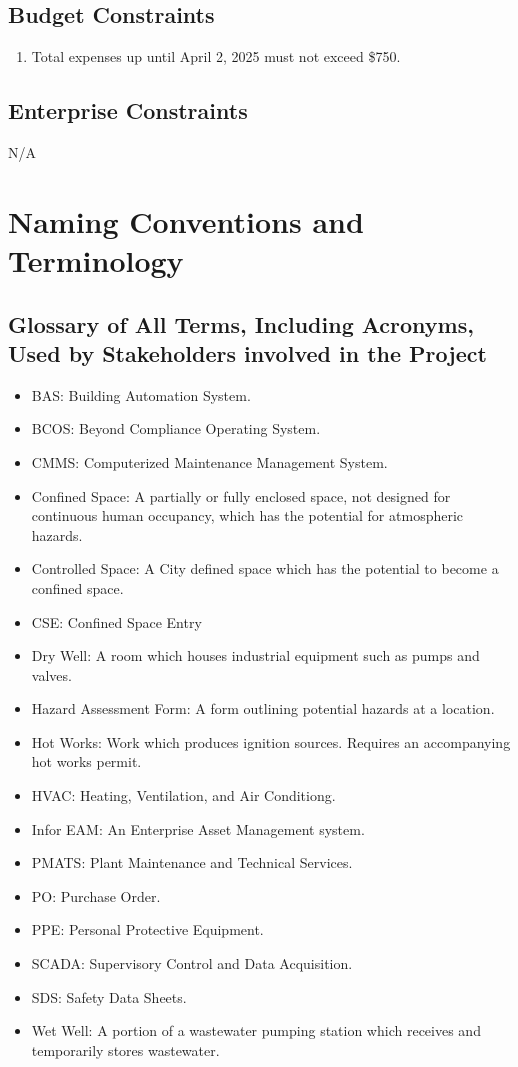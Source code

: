\documentclass[12pt]{article}
\begin{document}
\subsection{Budget Constraints}
\begin{enumerate} [{C-BDG}1.]
  \item Total expenses up until April 2, 2025 must not exceed \$750.
\end{enumerate}

\subsection{Enterprise Constraints}
N/A

\section{Naming Conventions and Terminology}
\subsection{Glossary of All Terms, Including Acronyms, Used by Stakeholders
involved in the Project}
\begin{itemize}
  \item BAS: Building Automation System.
  \item BCOS: Beyond Compliance Operating System.
  \item CMMS: Computerized Maintenance Management System.
  \item Confined Space: A partially or fully enclosed space, not designed for
    continuous human occupancy, which has the potential for atmospheric hazards.
  \item Controlled Space: A City defined space which has the potential to
    become a confined space.
  \item CSE: Confined Space Entry
  \item Dry Well: A room which houses industrial equipment such as pumps
    and valves.
  \item Hazard Assessment Form: A form outlining potential
    hazards at a location.
  \item Hot Works: Work which produces ignition sources.
    Requires an accompanying hot works permit.
  \item HVAC: Heating, Ventilation, and Air Conditiong.
  \item Infor EAM: An Enterprise Asset Management system.
  \item PMATS: Plant Maintenance and Technical Services.
  \item PO: Purchase Order.
  \item PPE: Personal Protective Equipment.
  \item SCADA: Supervisory Control and Data Acquisition.
  \item SDS: Safety Data Sheets.
  \item Wet Well: A portion of a wastewater pumping station which receives
    and temporarily stores wastewater.
\end{itemize}
\end{document}
